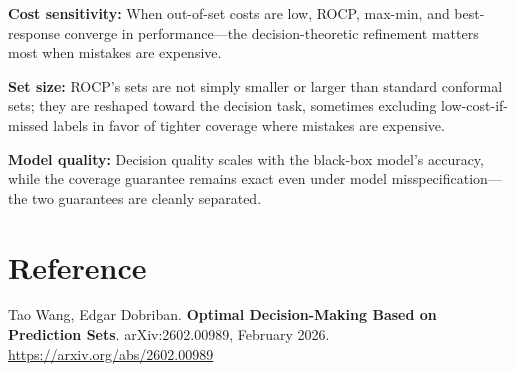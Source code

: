\documentclass[10pt,twocolumn]{article}
\begin{document}
\textbf{Cost sensitivity:} When out-of-set costs are low, ROCP, max-min,
and best-response converge in performance---the decision-theoretic
refinement matters most when mistakes are expensive.

\textbf{Set size:} ROCP's sets are not simply smaller or larger than
standard conformal sets; they are reshaped toward the decision task,
sometimes excluding low-cost-if-missed labels in favor of tighter
coverage where mistakes are expensive.

\textbf{Model quality:} Decision quality scales with the black-box
model's accuracy, while the coverage guarantee remains exact even under
model misspecification---the two guarantees are cleanly separated.

\section*{Reference}

Tao Wang, Edgar Dobriban.
\textbf{Optimal Decision-Making Based on Prediction Sets}.
arXiv:2602.00989, February 2026.
\url{https://arxiv.org/abs/2602.00989}
\end{document}
